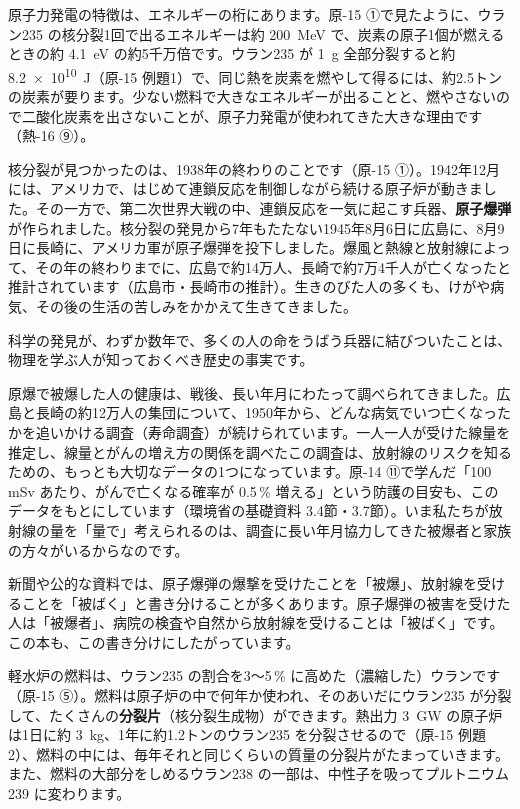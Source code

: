 原子力発電の特徴は、エネルギーの桁にあります。原-15 ①で見たように、ウラン235 の核分裂1回で出るエネルギーは約 \qty{200}{MeV} で、炭素の原子1個が燃えるときの約 \qty{4.1}{eV} の約5千万倍です。ウラン235 が \qty{1}{g} 全部分裂すると約 \qty{8.2e10}{J}（原-15 例題1）で、同じ熱を炭素を燃やして得るには、約2.5トンの炭素が要ります。少ない燃料で大きなエネルギーが出ることと、燃やさないので二酸化炭素を出さないことが、原子力発電が使われてきた大きな理由です（熱-16 ⑨）。

核分裂が見つかったのは、1938年の終わりのことです（原-15 ①）。1942年12月には、アメリカで、はじめて連鎖反応を制御しながら続ける原子炉が動きました。その一方で、第二次世界大戦の中、連鎖反応を一気に起こす兵器、\textbf{原子爆弾}が作られました。核分裂の発見から7年もたたない1945年8月6日に広島に、8月9日に長崎に、アメリカ軍が原子爆弾を投下しました。爆風と熱線と放射線によって、その年の終わりまでに、広島で約14万人、長崎で約7万4千人が亡くなったと推計されています（広島市・長崎市の推計）。生きのびた人の多くも、けがや病気、その後の生活の苦しみをかかえて生きてきました。

科学の発見が、わずか数年で、多くの人の命をうばう兵器に結びついたことは、物理を学ぶ人が知っておくべき歴史の事実です。

原爆で被爆した人の健康は、戦後、長い年月にわたって調べられてきました。広島と長崎の約12万人の集団について、1950年から、どんな病気でいつ亡くなったかを追いかける調査（寿命調査）が続けられています。一人一人が受けた線量を推定し、線量とがんの増え方の関係を調べたこの調査は、放射線のリスクを知るための、もっとも大切なデータの1つになっています。原-14 ⑪で学んだ「100 mSv あたり、がんで亡くなる確率が 0.5\,\% 増える」という防護の目安も、このデータをもとにしています（環境省の基礎資料 3.4節・3.7節）。いま私たちが放射線の量を「量で」考えられるのは、調査に長い年月協力してきた被爆者と家族の方々がいるからなのです。

\begin{phmijika}
新聞や公的な資料では、原子爆弾の爆撃を受けたことを「被爆」、放射線を受けることを「被ばく」と書き分けることが多くあります。原子爆弾の被害を受けた人は「被爆者」、病院の検査や自然から放射線を受けることは「被ばく」です。この本も、この書き分けにしたがっています。
\end{phmijika}

\leavevmode\label{ph:原-16:sec2}軽水炉の燃料は、ウラン235 の割合を3〜5\,\% に高めた（濃縮した）ウランです（原-15 ⑤）。燃料は原子炉の中で何年か使われ、そのあいだにウラン235 が分裂して、たくさんの\textbf{分裂片}（核分裂生成物）ができます。熱出力 \qty{3}{GW} の原子炉は1日に約 \qty{3}{kg}、1年に約1.2トンのウラン235 を分裂させるので（原-15 例題2）、燃料の中には、毎年それと同じくらいの質量の分裂片がたまっていきます。また、燃料の大部分をしめるウラン238 の一部は、中性子を吸ってプルトニウム239 に変わります。

